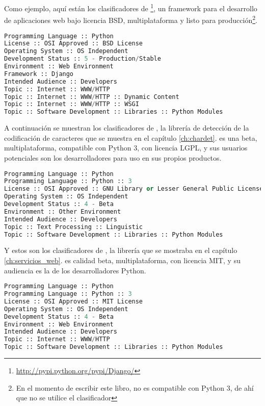 Como ejemplo, aquí están los clasificadores de \footnote{\href{http://pypi.python.org/pypi/Django/}{http://pypi.python.org/pypi/Django/}}, un framework para el desarrollo de aplicaciones web bajo licencia BSD, multiplataforma y listo para producción\footnote{En el momento de escribir este libro,  no es compatible con Python 3, de ahí que no se utilice el clasificador }.

\begin{lstlisting}[language=Python,breaklines=true]
Programming Language :: Python
License :: OSI Approved :: BSD License
Operating System :: OS Independent
Development Status :: 5 - Production/Stable
Environment :: Web Environment
Framework :: Django
Intended Audience :: Developers
Topic :: Internet :: WWW/HTTP
Topic :: Internet :: WWW/HTTP :: Dynamic Content
Topic :: Internet :: WWW/HTTP :: WSGI
Topic :: Software Development :: Libraries :: Python Modules
\end{lstlisting}

A continuación se muestran los clasificadores de , la librería de detección de la codificación de caracteres que se muestra en el capítulo \ref{ch:chardet}.  es una beta, multiplataforma, compatible con Python 3, con licencia LGPL, y sus usuarios potenciales son los desarrolladores para uso en sus propios productos.


\begin{lstlisting}[language=Python,breaklines=true]
Programming Language :: Python
Programming Language :: Python :: 3
License :: OSI Approved :: GNU Library or Lesser General Public License (LGPL)
Operating System :: OS Independent
Development Status :: 4 - Beta
Environment :: Other Environment
Intended Audience :: Developers
Topic :: Text Processing :: Linguistic
Topic :: Software Development :: Libraries :: Python Modules
\end{lstlisting}

Y estos son los clasificadores de , la librería que se mostraba en el capítulo \ref{ch:servicios_web}.  es calidad beta, multiplataforma, con licencia MIT, y su audiencia es la de los desarrolladores Python.


\begin{lstlisting}[language=Python,breaklines=true]
Programming Language :: Python
Programming Language :: Python :: 3
License :: OSI Approved :: MIT License
Operating System :: OS Independent
Development Status :: 4 - Beta
Environment :: Web Environment
Intended Audience :: Developers
Topic :: Internet :: WWW/HTTP
Topic :: Software Development :: Libraries :: Python Modules
\end{lstlisting}

